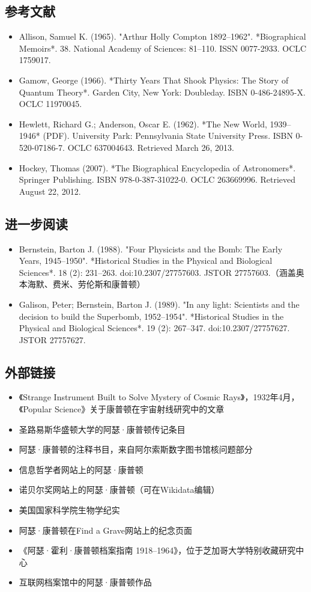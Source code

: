 \subsection{参考文献}
\begin{itemize}
\item Allison, Samuel K. (1965). "Arthur Holly Compton 1892–1962". *Biographical Memoirs*. 38. National Academy of Sciences: 81–110. ISSN 0077-2933. OCLC 1759017.
\item Gamow, George (1966). *Thirty Years That Shook Physics: The Story of Quantum Theory*. Garden City, New York: Doubleday. ISBN 0-486-24895-X. OCLC 11970045.
\item Hewlett, Richard G.; Anderson, Oscar E. (1962). *The New World, 1939–1946* (PDF). University Park: Pennsylvania State University Press. ISBN 0-520-07186-7. OCLC 637004643. Retrieved March 26, 2013.
\item Hockey, Thomas (2007). *The Biographical Encyclopedia of Astronomers*. Springer Publishing. ISBN 978-0-387-31022-0. OCLC 263669996. Retrieved August 22, 2012.
\end{itemize}
\subsection{进一步阅读}
\begin{itemize}
\item Bernstein, Barton J. (1988). "Four Physicists and the Bomb: The Early Years, 1945–1950". *Historical Studies in the Physical and Biological Sciences*. 18 (2): 231–263. doi:10.2307/27757603. JSTOR 27757603.（涵盖奥本海默、费米、劳伦斯和康普顿）
\item Galison, Peter; Bernstein, Barton J. (1989). "In any light: Scientists and the decision to build the Superbomb, 1952–1954". *Historical Studies in the Physical and Biological Sciences*. 19 (2): 267–347. doi:10.2307/27757627. JSTOR 27757627.
\end{itemize}
\subsection{外部链接}
\begin{itemize}
\item 《Strange Instrument Built to Solve Mystery of Cosmic Rays》，1932年4月，《Popular Science》关于康普顿在宇宙射线研究中的文章
\item 圣路易斯华盛顿大学的阿瑟·康普顿传记条目
\item 阿瑟·康普顿的注释书目，来自阿尔索斯数字图书馆核问题部分
\item 信息哲学者网站上的阿瑟·康普顿
\item 诺贝尔奖网站上的阿瑟·康普顿（可在Wikidata编辑）
\item 美国国家科学院生物学纪实
\item 阿瑟·康普顿在Find a Grave网站上的纪念页面
\item 《阿瑟·霍利·康普顿档案指南 1918–1964》，位于芝加哥大学特别收藏研究中心
\item 互联网档案馆中的阿瑟·康普顿作品
\end{itemize}